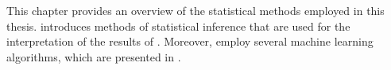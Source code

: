 This chapter provides an overview of the statistical methods employed in this
thesis.  introduces methods of statistical
inference that are used for the interpretation of the results of
. Moreover,
 employ several machine
learning algorithms, which are presented in .

